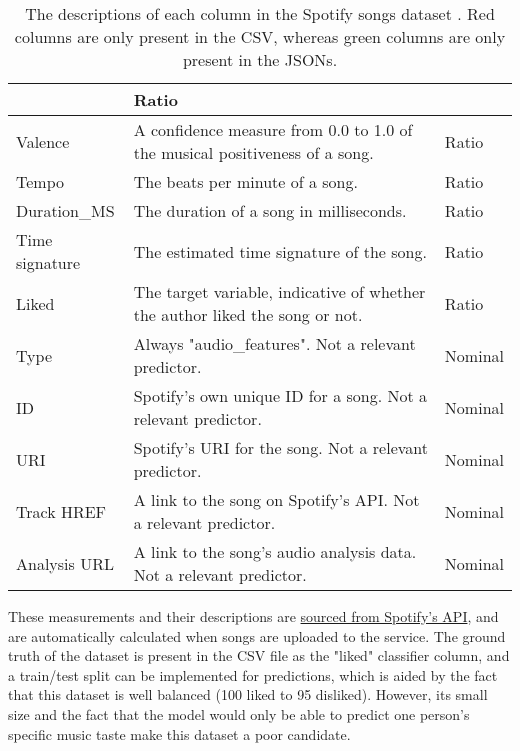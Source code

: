 \begin{table}[H]
\begin{tabular}{ |p{}| p{}| p{}|}
            & Ratio\\
            \hline
            Valence & A confidence measure from 0.0 to 1.0 of the musical positiveness of a song.
            & Ratio\\
            \hline
            Tempo & The beats per minute of a song.
            & Ratio\\
            \hline
            Duration\_MS & The duration of a song in milliseconds.
            & Ratio\\
            \hline
            Time signature & The estimated time signature of the song.
            & Ratio\\
            \hline
            \cellcolor{red!15}Liked & The target variable, indicative of whether the author liked the song or not.
            & Ratio\\
            \hline
            \cellcolor{green!15}Type & Always "audio\_features". Not a relevant predictor.
            & Nominal\\
            \hline
            \cellcolor{green!15}ID & Spotify's own unique ID for a song. Not a relevant predictor.
            & Nominal\\
            \hline
            \cellcolor{green!15}URI & Spotify's URI for the song. Not a relevant predictor.
            & Nominal\\
            \hline
            \cellcolor{green!15}Track HREF & A link to the song on Spotify's API. Not a relevant predictor.
            & Nominal\\  
            \hline
            \cellcolor{green!15}Analysis URL & A link to the song's audio analysis data. Not a relevant predictor. 
            & Nominal\\
            \hline
    \end{tabular}
    \caption{The descriptions of each column in the Spotify songs dataset \autocite{spotify_web_nodate}. Red columns are only present in the CSV, whereas green columns are only present in the JSONs.}\label{tab:Spotify-Types}
\end{table}

These measurements and their descriptions are \href{https://developer.spotify.com/documentation/web-api/reference/get-audio-features}{sourced from Spotify's API},
and are automatically calculated when songs are uploaded to the service. The ground truth of the dataset is present in the CSV file as the "liked" classifier 
column, and a train/test split can be implemented for predictions, which is aided by the fact that this dataset is well balanced (100 liked to 95 disliked).
However, its small size and the fact that the model would only be able to predict one person's specific music taste make 
this dataset a poor candidate. 


